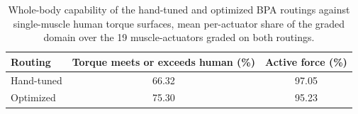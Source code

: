 \begin{table}[H]
\caption{Whole-body capability of the hand-tuned and optimized BPA routings against single-muscle human torque surfaces, mean per-actuator share of the graded domain over the 19 muscle-actuators graded on both routings.}
\label{tab:CapabilitySurvey}
\begingroup
\renewcommand{\arraystretch}{1.4}%
\fontsize{10pt}{12pt}\selectfont
\begin{tabular}{@{}lcc@{}}
\toprule
\textbf{Routing} & \textbf{Torque meets or exceeds human (\%)} & \textbf{Active force (\%)} \\
\midrule
Hand-tuned & 66.32 & 97.05 \\
Optimized & 75.30 & 95.23 \\
\bottomrule
\end{tabular}
\endgroup
\end{table}
